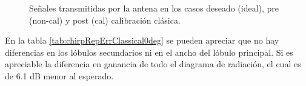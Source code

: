 \begin{figure}[H]
	\centering

	\caption{Señales transmitidas por la antena en los casos deseado (ideal), pre (non-cal) y post (cal) calibración clásica.}
	\label{fig:chirpRepErrClassical0deg}
\end{figure}

En la tabla \ref{tab:chirpRepErrClassical0deg} se pueden apreciar que no hay diferencias en los lóbulos secundarios ni en el
ancho del lóbulo principal. Si es apreciable la diferencia en ganancia de todo el diagrama de radiación, el cual es de 6.1 dB
menor al esperado.


